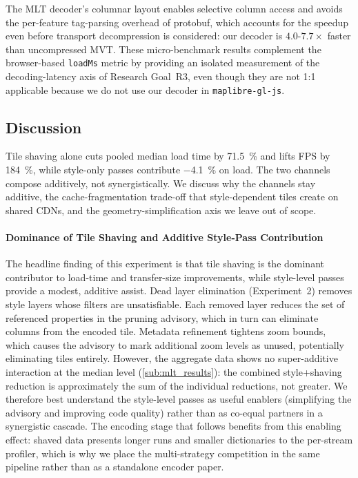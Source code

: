 The \ac{MLT} decoder's columnar layout enables selective column access and avoids the per-feature tag-parsing overhead of protobuf, which accounts for the speedup even before transport decompression is considered: our decoder is $4.0$-$7.7\times$ faster than uncompressed \ac{MVT}.
These micro-benchmark results complement the browser-based \texttt{loadMs} metric by providing an isolated measurement of the decoding-latency axis of Research Goal~R3, even though they are not 1:1 applicable because we do not use our decoder in \texttt{maplibre-gl-js}.

\subsection{Discussion}\label{sub:mlt_discussion}

Tile shaving alone cuts pooled median load time by \qty{71.5}{\percent} and lifts \ac{FPS} by \qty{184}{\percent}, while style-only passes contribute \qty{-4.1}{\percent} on load.
The two channels compose additively, not synergistically.
We discuss why the channels stay additive, the cache-fragmentation trade-off that style-dependent tiles create on shared \acsp{CDN}, and the geometry-simplification axis we leave out of scope.

\paragraph{Dominance of Tile Shaving and Additive Style-Pass Contribution}
The headline finding of this experiment is that tile shaving is the dominant contributor to load-time and transfer-size improvements, while style-level passes provide a modest, additive assist.
Dead layer elimination (Experiment~2) removes style layers whose filters are unsatisfiable.
Each removed layer reduces the set of referenced properties in the pruning advisory, which in turn can eliminate columns from the encoded tile.
Metadata refinement tightens zoom bounds, which causes the advisory to mark additional zoom levels as unused, potentially eliminating tiles entirely.
However, the aggregate data shows no super-additive interaction at the median level (\cref{sub:mlt_results}): the combined style+shaving reduction is approximately the sum of the individual reductions, not greater.
We therefore best understand the style-level passes as useful enablers (simplifying the advisory and improving code quality) rather than as co-equal partners in a synergistic cascade.
The encoding stage that follows benefits from this enabling effect: shaved data presents longer runs and smaller dictionaries to the per-stream profiler, which is why we place the multi-strategy competition in the same pipeline rather than as a standalone encoder paper.

